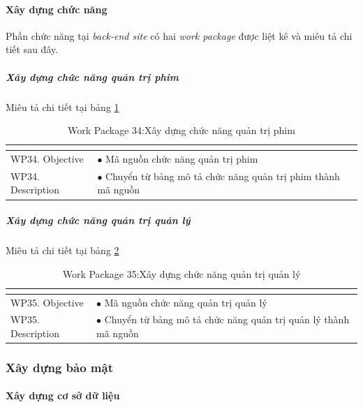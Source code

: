 \documentclass[a4paper]{book}
\begin{document}
\paragraph{Xây dựng chức năng}
Phần chức năng tại \textit{back-end site} có hai \textit{work package} được liệt kê và miêu tả chi tiết sau đây.
\subparagraph{Xây dựng chức năng quản trị phim} Miêu tả chi tiết tại bảng \ref{table:backend_xd_cn_phim}
\begin{table}[h!]
	\begin{center}
		\begin{tabular}{|p{4cm}|p{10cm}|}
			\hline
			\multicolumn{2}{|c|}{\cellcolor[HTML]{363636}{\color[HTML]{FFFFFF}Work package 34: Xây dựng chức năng quản trị phim}}\\
			\hline
			\multirow{1}{*}{WP34. Objective} & $\bullet$ Mã nguồn chức năng quản trị phim\\
			\hline
			\multirow{1}{*}{WP34. Description} & $\bullet$ Chuyển từ bảng mô tả chức năng quản trị phim thành mã nguồn \\
			\hline
		\end{tabular}
		\caption{Work Package 34:Xây dựng chức năng quản trị phim}
		\label{table:backend_xd_cn_phim}
	\end{center}
\end{table}
\subparagraph{Xây dựng chức năng quản trị quản lý} Miêu tả chi tiết tại bảng \ref{table:backend_xd_cn_quanly}
\begin{table}[h!]
	\begin{center}
		\begin{tabular}{|p{4cm}|p{10cm}|}
			\hline
			\multicolumn{2}{|c|}{\cellcolor[HTML]{363636}{\color[HTML]{FFFFFF}Work package 35: Xây dựng chức năng quản trị quản lý}}\\
			\hline
			\multirow{1}{*}{WP35. Objective} & $\bullet$ Mã nguồn chức năng quản trị quản lý\\
			\hline
			\multirow{1}{*}{WP35. Description} & $\bullet$ Chuyển từ bảng mô tả chức năng quản trị quản lý thành mã nguồn \\
			\hline
		\end{tabular}
		\caption{Work Package 35:Xây dựng chức năng quản trị quản lý}
		\label{table:backend_xd_cn_quanly}
	\end{center}
\end{table}
\subsubsection{Xây dựng bảo mật}
\paragraph{Xây dựng cơ sở dữ liệu}
\end{document}
